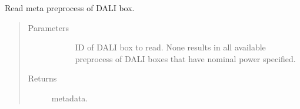 \documentclass[letterpaper,10pt,english]{sphinxmanual}
\begin{document}

\begin{fulllineitems}
\label{\detokenize{autoapi/src/utils/snowflake/index:src.utils.snowflake.read_meta}}
Read meta preprocess of DALI box.
\begin{quote}\begin{description}
\item[{Parameters}] \leavevmode\begin{description}
\item[{}] \leavevmode{[}\sphinxhref{https://docs.python.org/3/library/stdtypes.html\#list}{\sphinxcode{\sphinxupquote{list}}}{]}
ID of DALI box to read. None results in all available preprocess of DALI boxes that have nominal power specified.

\end{description}

\item[{Returns}] \leavevmode\begin{description}
\item[{  metadata.}] \leavevmode
\end{description}

\end{description}\end{quote}

\end{fulllineitems}

\end{document}
